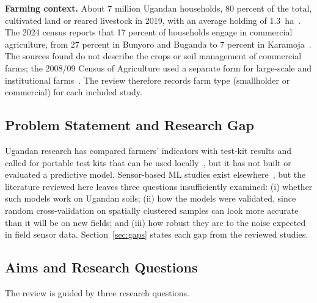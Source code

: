\documentclass[conference]{IEEEtran}
\begin{document}
\noindent\textbf{Farming context.} About 7 million Ugandan households, 80 percent
of the total, cultivated land or reared livestock in 2019, with an average
holding of 1.3~ha~\cite{ref15}. The 2024 census reports that 17 percent of
households engage in commercial agriculture, from 27 percent in Bunyoro and
Buganda to 7 percent in Karamoja~\cite{ref16}. The sources found do not describe
the crops or soil management of commercial farms; the 2008/09 Census of
Agriculture used a separate form for large-scale and institutional
farms~\cite{ref17}. The review therefore records farm type (smallholder or
commercial) for each included study.

\subsection{Problem Statement and Research Gap}
Ugandan research has compared farmers' indicators with test-kit results and
called for portable test kits that can be used
locally~\cite{ref2}, but it has not built or evaluated a predictive model.
Sensor-based ML studies exist elsewhere~\cite{ref4,ref6,ref11}, but the
literature reviewed here leaves three questions insufficiently examined:
(i) whether such models work on Ugandan soils; (ii) how the models were
validated, since random cross-validation on spatially clustered samples can look
more accurate than it will be on new fields; and (iii) how robust they are to the
noise expected in field sensor data. Section~\ref{sec:gaps} states each gap from
the reviewed studies.

\subsection{Aims and Research Questions}
The review is guided by three research questions.
\end{document}
